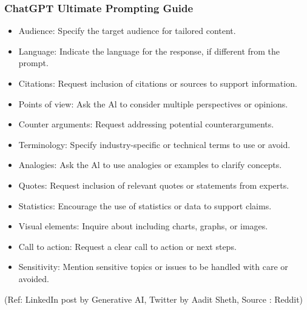 \begin{frame}[fragile]\frametitle{ChatGPT Ultimate Prompting Guide}

\begin{itemize}
\item Audience: Specify the target audience for tailored content. 
\item Language: Indicate the language for the response, if different from the prompt. 
\item Citations: Request inclusion of citations or sources to support information. 
\item Points of view: Ask the Al to consider multiple perspectives or opinions. 
\item Counter arguments: Request addressing potential counterarguments. 
\item Terminology: Specify industry-specific or technical terms to use or avoid.
\item Analogies: Ask the Al to use analogies or examples to clarify concepts. 
\item Quotes: Request inclusion of relevant quotes or statements from experts. 
\item Statistics: Encourage the use of statistics or data to support claims. 
\item Visual elements: Inquire about including charts, graphs, or images. 
\item Call to action: Request a clear call to action or next steps. 
\item Sensitivity: Mention sensitive topics or issues to be handled with care or avoided. 
\end{itemize}	 


{\tiny (Ref: LinkedIn post by Generative AI, Twitter by Aadit Sheth, Source : Reddit)}
			

\end{frame}

